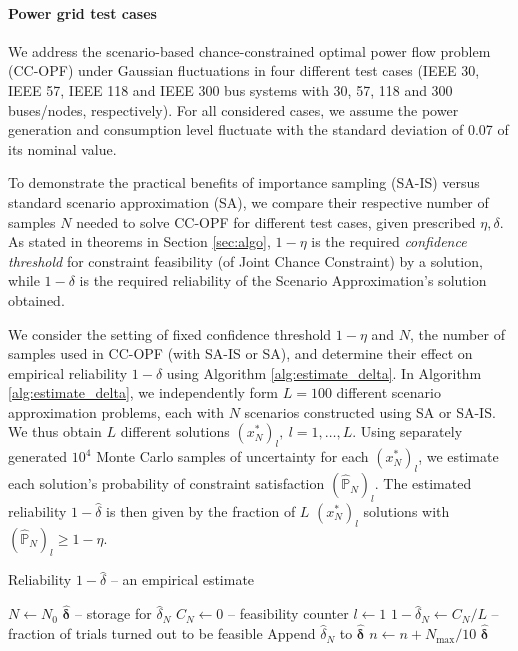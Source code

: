 \paragraph{Power grid test cases}
We address the scenario-based chance-constrained optimal power flow problem (CC-OPF) under Gaussian fluctuations in four different test cases (IEEE 30, IEEE 57, IEEE 118 and IEEE 300 bus systems with 30, 57, 118 and 300 buses/nodes, respectively). For all considered cases, we assume the power generation and consumption level fluctuate with the standard deviation of 0.07 of its nominal value. 

To demonstrate the practical benefits of importance sampling (SA-IS) versus standard scenario approximation (SA), we compare their respective number of samples $N$ needed to solve CC-OPF for different test cases, given prescribed $\eta,\delta$. As stated in theorems in Section \ref{sec:algo}, $1-\eta$ is the required \emph{confidence threshold} for constraint feasibility (of Joint Chance Constraint) by a solution, while $1-\delta$ is the required reliability of the Scenario Approximation's solution obtained.


We consider the setting of fixed confidence threshold $1-\eta$ and $N$, the number of samples used in CC-OPF (with SA-IS or SA), and determine their effect on empirical reliability $1-\hat{\delta}$ using Algorithm \ref{alg:estimate_delta}. In Algorithm \ref{alg:estimate_delta}, we independently form $L=100$ different scenario approximation problems, each with $N$ scenarios constructed using SA or SA-IS. We thus obtain $L$ different solutions $(x^*_N)_l, ~ l=1, \dots, L$. Using separately generated $10^4$ Monte Carlo samples of uncertainty for each $(x^*_N)_l$, we estimate each solution's probability of constraint satisfaction $(\hat{\mathbb{P}}_N)_l$. The estimated reliability $1-\hat{\delta}$ is then given by the fraction of $L$ $(x^*_N)_l$ solutions with $(\hat{\mathbb{P}}_N)_l \geq 1 - \eta$. 

\begin{algorithm}[ht]
\caption{Reliability $1-\hat{\delta}$ -- an empirical estimate}\label{alg:estimate_delta}
$N \gets N_0$\;
$\hat{ \boldsymbol \delta}$ -- storage for $\hat{\delta}_N$\;
{
     $C_N \gets 0$ -- feasibility counter\;
     $l \gets 1$\;
    $1-\hat{\delta}_N \gets C_N / L$ -- fraction of trials turned out to be feasible \;
    Append $\hat{\delta}_N$ to $\hat{ \boldsymbol \delta}$ \;
    $n  \gets n + N_{\max}/ 10$\;
}
\Return $\hat{ \boldsymbol \delta}$
\end{algorithm}

